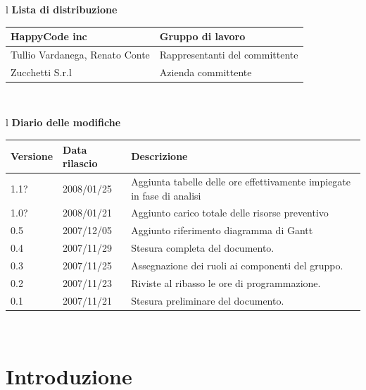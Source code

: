 \documentclass[11pt,titlepage,a4paper]{report}
\begin{document}
\begin{center}
\begin{table}[hbtp]
\large{
\begin{tabular}{l}
\Large{\textbf{\textsf{Lista di distribuzione}}} \\
\begin{tabular}{||p{6cm}||p{6cm}||} \hline
{HappyCode inc}& Gruppo di lavoro\\ \hline
{Tullio Vardanega, Renato Conte}& Rappresentanti del committente \\ \hline 
{Zucchetti S.r.l}& Azienda committente\\ \hline
\end{tabular} \\
\end{tabular}
}
\end{table}
\begin{table}[hbtp]
\large{
\begin{tabular}{l}
\Large{\textbf{\textsf{Diario delle modifiche}}} \\
\begin{tabular}{||p{2cm}||p{3.5cm}||p{6cm}||}
\hline
\textbf{Versione} & \textbf{Data rilascio} & \textbf{Descrizione} \\ \hline
1.1? & 2008/01/25 & Aggiunta tabelle delle ore effettivamente impiegate in fase di analisi \\ \hline
1.0? & 2008/01/21 & Aggiunto carico totale delle risorse preventivo \\ \hline
0.5 & 2007/12/05 & Aggiunto riferimento diagramma di Gantt \\ \hline
0.4 & 2007/11/29 & Stesura completa del documento. \\ \hline
0.3 & 2007/11/25 & Assegnazione dei ruoli ai componenti del gruppo. \\ \hline
0.2 & 2007/11/23 & Riviste al ribasso le ore di programmazione. \\ \hline
0.1 & 2007/11/21 & Stesura preliminare del documento. \\ \hline

\end{tabular} \\
\end{tabular}

}
\end{table}
\end{center}


\tableofcontents 


\chapter{Introduzione}
\end{document}
